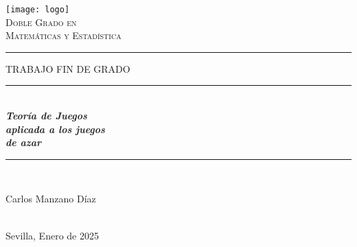 \documentclass[12pt,a4paper,]{book}
\title{}
\author{}
\date{}
\numberwithin{dummy}{section}
\theoremstyle{ocrenumbox}
\theoremstyle{blacknumex}
\theoremstyle{blacknumbox}
\theoremstyle{ocrenum}
\theoremstyle{ocrenum}
\begin{document}



\begin{titlepage}

\newcommand{\HRule}{\rule{\linewidth}{0.5mm}} %

\center %


\begin{minipage}{14cm}
\center

\texttt{[image: logo]}\\[0.5cm] %


\textsc{\LARGE Doble Grado en \\[0.2cm]
Matemáticas y Estadística}\\[2.3cm] 



\rule[1.7mm]{2cm}{0.5mm}
\hfill
\textsc{\Large TRABAJO FIN DE GRADO} 
\hfill
\rule[1.7mm]{2cm}{0.5mm} 
\\[0.75cm]

{\Huge
\textbf{\textit{
Teoría de Juegos \\[0.2cm]
aplicada a los juegos \\[0.5cm]
de azar
}}}\\[0.75cm] 

\HRule \\[3.5cm]


{\Large

Carlos Manzano Díaz} \\[0.5cm]

{\large
Sevilla, Enero de 2025
}

\end{minipage}

\vfill %

\cleardoublepage
\thispagestyle{empty}
\end{titlepage}
\end{document}
